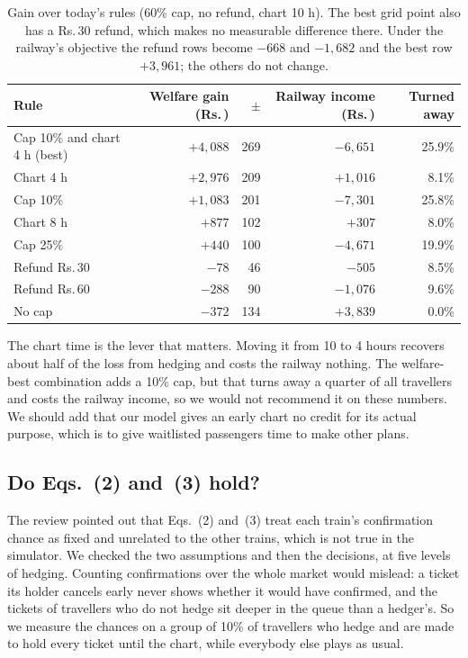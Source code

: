 \documentclass{article}
\newcommand{\rs}{Rs.\,}
\theoremstyle{definition}
\begin{document}
\begin{table}[ht]
\caption{Gain over today's rules (60\% cap, no refund, chart 10 h). The best grid point
also has a \rs30 refund, which makes no measurable difference there. Under the railway's
objective the refund rows become $-668$ and $-1{,}682$ and the best row $+3{,}961$; the
others do not change.}
\label{tab:rank}
\centering
\small
\begin{tabular}{lrrrr}
\toprule
Rule & Welfare gain (\rs) & $\pm$ & Railway income (\rs) & Turned away \\
\midrule
Cap 10\% and chart 4 h (best) & $+4{,}088$ & 269 & $-6{,}651$ & 25.9\% \\
Chart 4 h & $+2{,}976$ & 209 & $+1{,}016$ & 8.1\% \\
Cap 10\% & $+1{,}083$ & 201 & $-7{,}301$ & 25.8\% \\
Chart 8 h & $+877$ & 102 & $+307$ & 8.0\% \\
Cap 25\% & $+440$ & 100 & $-4{,}671$ & 19.9\% \\
Refund \rs30 & $-78$ & 46 & $-505$ & 8.5\% \\
Refund \rs60 & $-288$ & 90 & $-1{,}076$ & 9.6\% \\
No cap & $-372$ & 134 & $+3{,}839$ & 0.0\% \\
\bottomrule
\end{tabular}
\end{table}

The chart time is the lever that matters. Moving it from 10 to 4 hours recovers about half
of the loss from hedging and costs the railway nothing. The welfare-best combination adds a
10\% cap, but that turns away a quarter of all travellers and costs the railway income, so
we would not recommend it on these numbers. We should add that our model gives an early
chart no credit for its actual purpose, which is to give waitlisted passengers time to make
other plans.

\subsection{Do Eqs.~(2) and~(3) hold?}
\label{sec:rules}

The review pointed out that Eqs.~(2) and~(3) treat each train's confirmation chance as
fixed and unrelated to the other trains, which is not true in the simulator. We checked
the two assumptions and then the decisions, at five levels of hedging. Counting
confirmations over the whole market would mislead: a ticket its holder cancels early never
shows whether it would have confirmed, and the tickets of travellers who do not hedge sit
deeper in the queue than a hedger's. So we measure the chances on a group of 10\% of
travellers who hedge and are made to hold every ticket until the chart, while everybody
else plays as usual.
\end{document}
